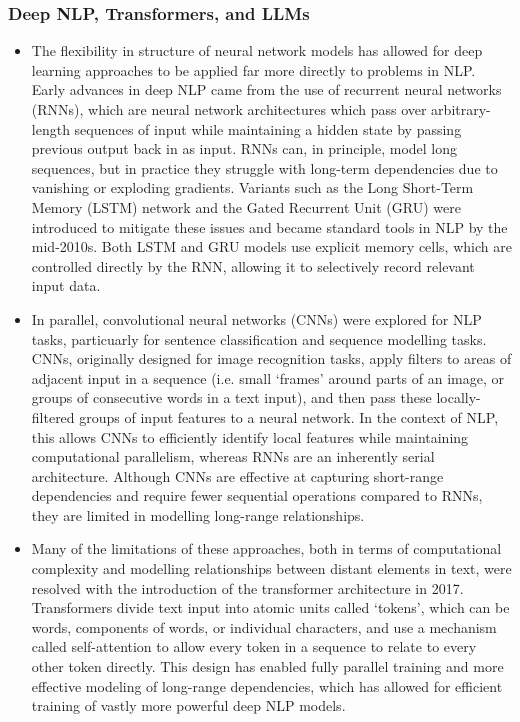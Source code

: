 \documentclass{report}
\begin{document}
\subsubsection{Deep NLP, Transformers, and LLMs}

\begin{itemize}
\item The flexibility in structure of neural network models has allowed for deep learning approaches to be applied far more directly to problems in NLP. Early advances in deep NLP came from the use of recurrent neural networks (RNNs), which are neural network architectures which pass over arbitrary-length sequences of input while maintaining a hidden state by passing previous output back in as input. RNNs can, in principle, model long sequences, but in practice they struggle with long-term dependencies due to vanishing or exploding gradients\cite{hochreiter1997long}. Variants such as the Long Short-Term Memory (LSTM) network and the Gated Recurrent Unit (GRU) were introduced to mitigate these issues and became standard tools in NLP by the mid-2010s. Both LSTM and GRU models use explicit memory cells, which are controlled directly by the RNN, allowing it to selectively record relevant input data\cite{cho2014gru}.

\item In parallel, convolutional neural networks (CNNs) were explored for NLP tasks, particuarly for sentence classification and sequence modelling tasks\cite{kim2014cnn}. CNNs, originally designed for image recognition tasks, apply filters to areas of adjacent input in a sequence (i.e. small `frames' around parts of an image, or groups of consecutive words in a text input), and then pass these locally-filtered groups of input features to a neural network. In the context of NLP, this allows CNNs to efficiently identify local features while maintaining computational parallelism, whereas RNNs are an inherently serial architecture. Although CNNs are effective at capturing short-range dependencies and require fewer sequential operations compared to RNNs, they are limited in modelling long-range relationships\cite{gehring2017convolutional}.

\item Many of the limitations of these approaches, both in terms of computational complexity and modelling relationships between distant elements in text, were resolved with the introduction of the transformer architecture in 2017. Transformers divide text input into atomic units called `tokens', which can be words, components of words, or individual characters, and use a mechanism called self-attention to allow every token in a sequence to relate to every other token directly\cite{vaswani-2017-attention-is-all-you-need}. This design has enabled fully parallel training and more effective modeling of long-range dependencies, which has allowed for efficient training of vastly more powerful deep NLP models.


\end{itemize}
\end{document}
